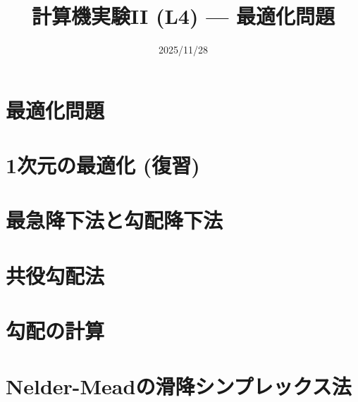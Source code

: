 \documentclass[10pt,dvipdfmx]{beamer}
\title{計算機実験II (L4) --- 最適化問題}
\date{2025/11/28}
\begin{document}
\begin{frame}
  \titlepage
  \tableofcontents
\end{frame}

\section{最適化問題}




\section{1次元の最適化 (復習)}







\section{最急降下法と勾配降下法}




\section{共役勾配法}










\section{勾配の計算}














\section{Nelder-Meadの滑降シンプレックス法}
\end{document}

